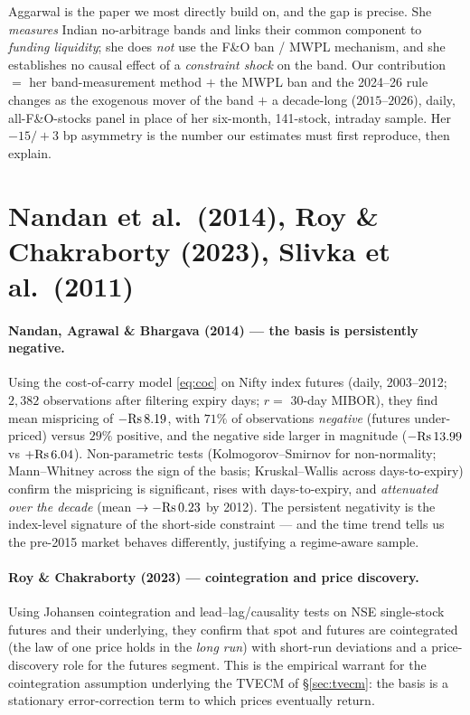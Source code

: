 \begin{takeaway}
Aggarwal is the paper we most directly build on, and the gap is precise. She \emph{measures} Indian no-arbitrage bands and links their common component to \emph{funding liquidity}; she does \emph{not} use the F\&O ban / MWPL mechanism, and she establishes no causal effect of a \emph{constraint shock} on the band. Our contribution $=$ her band-measurement method $+$ the MWPL ban and the 2024--26 rule changes as the exogenous mover of the band $+$ a decade-long ($2015$--$2026$), daily, all-F\&O-stocks panel in place of her six-month, 141-stock, intraday sample. Her $-15/+3$ bp asymmetry is the number our estimates must first reproduce, then explain.
\end{takeaway}

\section{Nandan et al.\ (2014), Roy \& Chakraborty (2023), Slivka et al.\ (2011)}
\label{sec:india-basis}

\paragraph{Nandan, Agrawal \& Bhargava (2014) --- the basis is persistently negative.} Using the cost-of-carry model \eqref{eq:coc} on Nifty index futures (daily, 2003--2012; $2{,}382$ observations after filtering expiry days; $r=$ 30-day MIBOR), they find mean mispricing of $-\mathrm{Rs}\, 8.19$, with $71\%$ of observations \emph{negative} (futures under-priced) versus $29\%$ positive, and the negative side larger in magnitude ($-\mathrm{Rs}\, 13.99$ vs $+\mathrm{Rs}\, 6.04$). Non-parametric tests (Kolmogorov--Smirnov for non-normality; Mann--Whitney across the sign of the basis; Kruskal--Wallis across days-to-expiry) confirm the mispricing is significant, rises with days-to-expiry, and \emph{attenuated over the decade} (mean $\to -\mathrm{Rs}\, 0.23$ by 2012). The persistent negativity is the index-level signature of the short-side constraint --- and the time trend tells us the pre-2015 market behaves differently, justifying a regime-aware sample.

\paragraph{Roy \& Chakraborty (2023) --- cointegration and price discovery.} Using Johansen cointegration and lead--lag/causality tests on NSE single-stock futures and their underlying, they confirm that spot and futures are cointegrated (the law of one price holds in the \emph{long run}) with short-run deviations and a price-discovery role for the futures segment. This is the empirical warrant for the cointegration assumption underlying the TVECM of \S\ref{sec:tvecm}: the basis is a stationary error-correction term to which prices eventually return.

